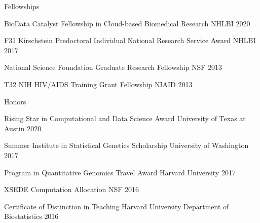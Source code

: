 


Fellowships 
\begin{cvhonors}

\cvhonor
{BioData Catalyst Fellowship in Cloud-based Biomedical Research} %
{NHLBI}
{ } %
{2020} %

  \cvhonor
    {F31 Kirschstein Predoctoral Individual National Research Service Award} %
    {NHLBI}
    { } %
    {2017} %

  \cvhonor
    {National Science Foundation Graduate Research Fellowship} %
    {NSF}
    { } %
    {2013} %
    
  \cvhonor %
    {T32 NIH HIV/AIDS Training Grant Fellowship} %
    {NIAID}
    { } %
    {2013} %
    
            
\end{cvhonors}

Honors 
\begin{cvhonors}
	
\cvhonor
{Rising Star in Computational and Data Science Award} %
{University of Texas at Austin} %
{ } %
{2020} %
	
	\cvhonor
	{Summer Institute in Statistical Genetics Scholarship} %
	{University of Washington} %
	{ } %
	{2017} %
	
	\cvhonor
	{Program in Quantitative Genomics Travel Award} %
	{Harvard University} %
	{ } %
	{2017} %
	
	\cvhonor
	{XSEDE Computation Allocation} %
	{NSF}
	{ } %
	{2016} %
	
	\cvhonor
	{Certificate of Distinction in Teaching} %
	{Harvard University Department of Biostatistics} %
	{ } %
	{2016} %
	
\end{cvhonors}
